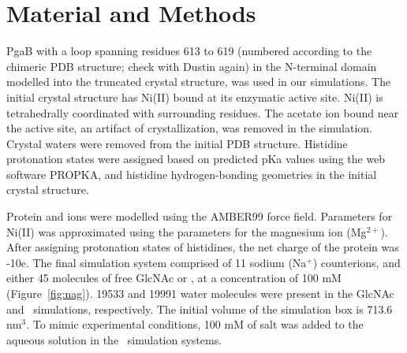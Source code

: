 
\section{Material and Methods}
PgaB with a loop spanning residues 613 to 619 (numbered according to the chimeric PDB structure; check with Dustin again) in the N-terminal domain modelled into the truncated crystal structure, was used in our simulations. The initial crystal structure has Ni(II) bound at its enzymatic active site. Ni(II) is tetrahedrally coordinated with surrounding residues.  The acetate ion bound near the active site, an artifact of crystallization, was removed in the simulation. Crystal waters were removed from the initial PDB structure. Histidine protonation states were assigned based on predicted pKa values using the web software PROPKA,\cite{Bas:2008ul,Olsson:2011vi,Sondergaard:2011ug} and histidine hydrogen-bonding geometries in the initial crystal structure.

Protein and ions were modelled using the AMBER99 force field.\cite{Cornell:1995td} Parameters for Ni(II) was approximated using the parameters for the magnesium ion (Mg$^{2+}$). After assigning protonation states of histidines, the net charge of the protein was -10e. The final simulation system comprised of 11 sodium (Na$^{+}$) counterions, and either 45 molecules of free GlcNAc or \glucosamine, at a concentration of 100 mM (Figure~\ref{fig:nag}). 19533 and 19991 water molecules were present in the GlcNAc and \glucosamine\ simulations, respectively. The initial volume of the simulation box is 713.6 nm$^{3}$.  To mimic experimental conditions, 100 mM of salt was added to the aqueous solution in the \glucosamine\ simulation systems.

